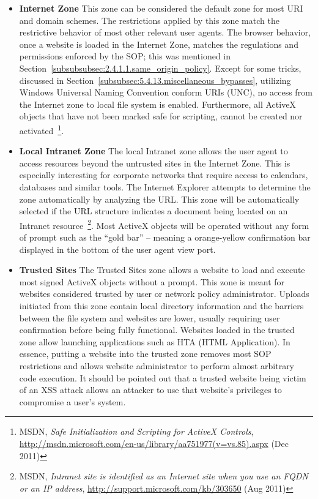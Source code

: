 	\begin{itemize}
	  \item \textbf{Internet Zone} This zone can be considered the default zone for most URI and domain schemes. The restrictions applied by this zone match the restrictive behavior of most other relevant user agents. The browser behavior, once a website is loaded in the Internet Zone,  matches the regulations and permissions enforced by the SOP; this was mentioned in Section~\ref{subsubsubsec:2.4.1.1.same_origin_policy}. Except for some tricks, discussed in Section~\ref{subsubsec:5.4.13.miscellaneous_bypasses}, utilizing Windows Universal Naming Convention conform URIs (UNC), no access from the Internet zone to local file system is enabled. Furthermore, all ActiveX objects that have not been marked safe for scripting, cannot be created nor activated~\footnote{MSDN, \textit{Safe Initialization and Scripting for ActiveX Controls}, \url{http://msdn.microsoft.com/en-us/library/aa751977(v=vs.85).aspx} (Dec 2011)}.
	  \item \textbf{Local Intranet Zone} The local Intranet zone allows the user agent to access resources beyond the untrusted sites in the Internet Zone. This is especially interesting for corporate networks that require access to calendars, databases and similar tools. The Internet Explorer attempts to determine the zone automatically by analyzing the URL. This zone will be automatically selected if the URL structure indicates a document being located on an Intranet resource~\footnote{MSDN, \textit{Intranet site is identified as an Internet site when you use an FQDN or an IP address}, \url{http://support.microsoft.com/kb/303650} (Aug 2011)}. Most ActiveX objects will be operated without any form of prompt such as the ``gold bar'' -- meaning a orange-yellow confirmation bar displayed in the bottom of the user agent view port.
	  \item \textbf{Trusted Sites} The Trusted Sites zone allows a website to load and execute most signed ActiveX objects without a prompt. This zone is meant for websites considered trusted by user or network policy administrator. Uploads initiated from this zone contain local directory information and the barriers between the file system and websites are lower, usually requiring user confirmation before being fully functional. Websites loaded in the trusted zone allow launching applications such as HTA (HTML Application). In essence, putting a website into the trusted zone removes most SOP restrictions and allows website administrator to perform almost arbitrary code execution. It should be pointed out that a trusted website being victim of an XSS attack allows an attacker to use that website's privileges to compromise a user's system. 

\end{itemize}
